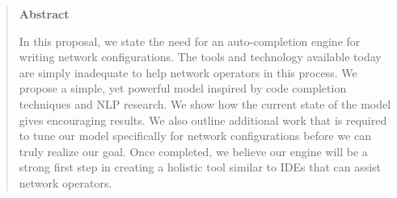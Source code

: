 \begin{quote}
\begin{center}{\bf \large Abstract}\end{center}
In this proposal, we state the need for an auto-completion engine for writing network configurations. The tools and technology available today are simply inadequate to help network operators in this process. We propose a simple, yet powerful model inspired by code completion techniques and NLP research. We show how the current state of the model gives encouraging results. We also outline additional work that is required to tune our model specifically for network configurations before we can truly realize our goal. Once completed, we believe our engine will be a strong first step in creating a holistic tool similar to IDEs that can assist network operators. 
\end{quote}
